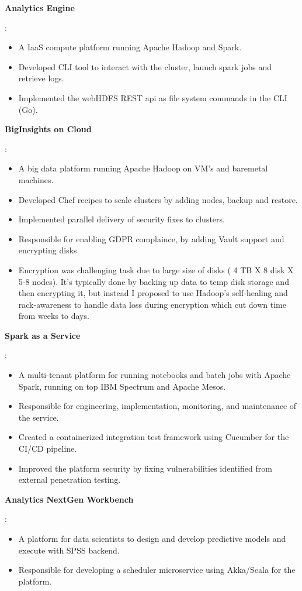 \documentclass[a4paper,11pt]{article}
\newcommand{\resumeItem}[2]{
  \item[]\small{
    \textbf{#1}{: #2 \vspace{-2pt}}
  }
}
\begin{document}
\resumeItem{Analytics Engine}
{
    \begin{itemize}[leftmargin=*]
        \item A IaaS compute platform running Apache Hadoop and Spark.
        \item Developed CLI tool to interact with the cluster, launch spark jobs and retrieve logs.
        \item Implemented the webHDFS REST api as file system commands in the CLI (Go).
    \end{itemize}
}

\resumeItem{BigInsights on Cloud}
{
    \begin{itemize}[leftmargin=*]
        \item A big data platform running Apache Hadoop on VM's and baremetal machines.
        \item Developed Chef recipes to scale clusters by adding nodes, backup and restore.
        \item Implemented parallel delivery of security fixes to clusters.
        \item Responsible for enabling GDPR complaince, by adding Vault support and encrypting disks.
        \item Encryption was challenging task due to large size of disks ( 4 TB X 8 disk X 5-8 nodes). It's typically done by backing up data to temp disk storage and then encrypting it, but instead I proposed to use Hadoop’s self-healing and rack-awareness to handle data loss during encryption which cut down time from weeks to days.
    \end{itemize}
}

\resumeItem{Spark as a Service}
{
    \begin{itemize}[leftmargin=*]
        \item A multi-tenant platform for running notebooks and batch jobs with Apache Spark, running on top IBM Spectrum and Apache Mesos.
        \item Responsible for engineering, implementation, monitoring, and maintenance of the service.
        \item Created a containerized integration test framework using Cucumber for the CI/CD pipeline.
        \item Improved the platform security by fixing vulnerabilities identified from external penetration testing.
    \end{itemize}
}

\resumeItem{Analytics NextGen Workbench}
{
    \begin{itemize}[leftmargin=*]
        \item A platform for data scientists to design and develop predictive models and execute with SPSS backend.
        \item Responsible for developing a scheduler microservice using Akka/Scala for the platform.
    \end{itemize}
}
\end{document}
